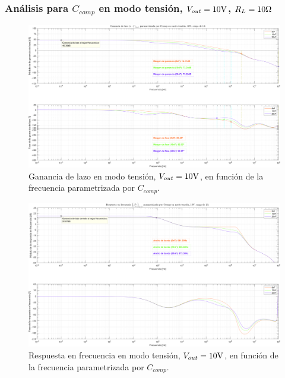 
\subsubsection{Análisis para $C_{comp}$ en modo tensión, $V_{out} = 10 \si[per-mode=symbol]{\volt}$, $R_{L} = 10 \si[per-mode=symbol]{\ohm}$}

\clearpage

\begin{figure}[H] %
\begin{center}
\includegraphics[width=1.1 \textwidth, angle=90]{./img/plots/loop/power_supply_CCOMP_LOOP_Modo1.png}
\caption{\label{fig:fig_power_supply_CCOMP_LOOP_Modo1}\footnotesize{Ganancia de lazo en modo tensión, $V_{out} = 10 \si[per-mode=symbol]{\volt}$, en función de la frecuencia parametrizada por $C_{comp}$.}}
\end{center}
\end{figure}


\clearpage

\begin{figure}[H] %
\begin{center}
\includegraphics[width=1.1 \textwidth, angle=90]{./img/plots/rf/power_supply_CCOMP_RF_Modo1.png}
\caption{\label{fig:fig_power_supply_CCOMP_RF_Modo1}\footnotesize{Respuesta en frecuencia en modo tensión, $V_{out} = 10 \si[per-mode=symbol]{\volt}$, en función de la frecuencia parametrizada por $C_{comp}$.}}
\end{center}
\end{figure}

